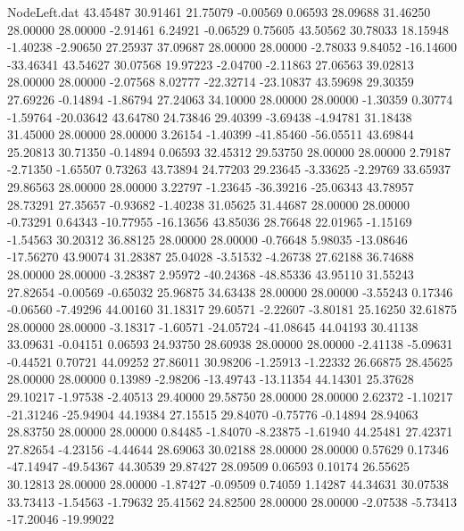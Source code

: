 \begin{filecontents}{NodeLeft.dat}
  43.45487   30.91461   21.75079    -0.00569    0.06593   28.09688   31.46250   28.00000   28.00000   -2.91461    6.24921   -0.06529    0.75605
  43.50562   30.78033   18.15948    -1.40238   -2.90650   27.25937   37.09687   28.00000   28.00000   -2.78033    9.84052  -16.14600  -33.46341
  43.54627   30.07568   19.97223    -2.04700   -2.11863   27.06563   39.02813   28.00000   28.00000   -2.07568    8.02777  -22.32714  -23.10837
  43.59698   29.30359   27.69226    -0.14894   -1.86794   27.24063   34.10000   28.00000   28.00000   -1.30359    0.30774   -1.59764  -20.03642
  43.64780   24.73846   29.40399    -3.69438   -4.94781   31.18438   31.45000   28.00000   28.00000    3.26154   -1.40399  -41.85460  -56.05511
  43.69844   25.20813   30.71350    -0.14894    0.06593   32.45312   29.53750   28.00000   28.00000    2.79187   -2.71350   -1.65507    0.73263
  43.73894   24.77203   29.23645    -3.33625   -2.29769   33.65937   29.86563   28.00000   28.00000    3.22797   -1.23645  -36.39216  -25.06343
  43.78957   28.73291   27.35657    -0.93682   -1.40238   31.05625   31.44687   28.00000   28.00000   -0.73291    0.64343  -10.77955  -16.13656
  43.85036   28.76648   22.01965    -1.15169   -1.54563   30.20312   36.88125   28.00000   28.00000   -0.76648    5.98035  -13.08646  -17.56270
  43.90074   31.28387   25.04028    -3.51532   -4.26738   27.62188   36.74688   28.00000   28.00000   -3.28387    2.95972  -40.24368  -48.85336
  43.95110   31.55243   27.82654    -0.00569   -0.65032   25.96875   34.63438   28.00000   28.00000   -3.55243    0.17346   -0.06560   -7.49296
  44.00160   31.18317   29.60571    -2.22607   -3.80181   25.16250   32.61875   28.00000   28.00000   -3.18317   -1.60571  -24.05724  -41.08645
  44.04193   30.41138   33.09631    -0.04151    0.06593   24.93750   28.60938   28.00000   28.00000   -2.41138   -5.09631   -0.44521    0.70721
  44.09252   27.86011   30.98206    -1.25913   -1.22332   26.66875   28.45625   28.00000   28.00000    0.13989   -2.98206  -13.49743  -13.11354
  44.14301   25.37628   29.10217    -1.97538   -2.40513   29.40000   29.58750   28.00000   28.00000    2.62372   -1.10217  -21.31246  -25.94904
  44.19384   27.15515   29.84070    -0.75776   -0.14894   28.94063   28.83750   28.00000   28.00000    0.84485   -1.84070   -8.23875   -1.61940
  44.25481   27.42371   27.82654    -4.23156   -4.44644   28.69063   30.02188   28.00000   28.00000    0.57629    0.17346  -47.14947  -49.54367
  44.30539   29.87427   28.09509     0.06593    0.10174   26.55625   30.12813   28.00000   28.00000   -1.87427   -0.09509    0.74059    1.14287
  44.34631   30.07538   33.73413    -1.54563   -1.79632   25.41562   24.82500   28.00000   28.00000   -2.07538   -5.73413  -17.20046  -19.99022

\end{filecontents}

